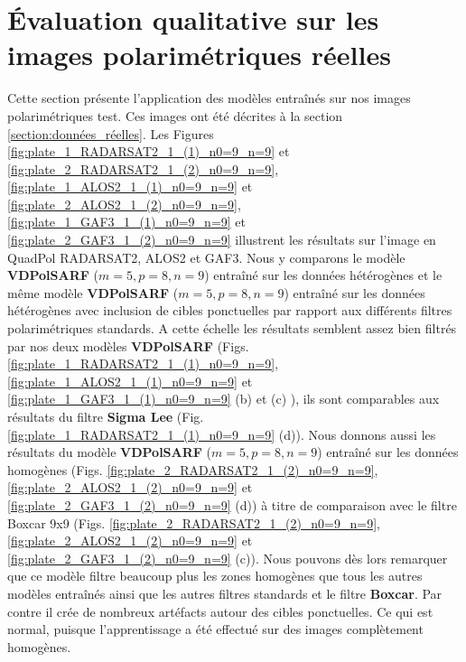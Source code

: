 

\section{Évaluation qualitative sur les images polarimétriques réelles} \label{sec:Evaluation_qualitative_sur_les_images_polarimetriques_reelles}

Cette section présente l'application des modèles entraînés sur nos images polarimétriques test.  Ces images ont été décrites à la section \ref{section:données_réelles}.  Les Figures \ref{fig:plate_1_RADARSAT2_1_(1)_n0=9_n=9} et \ref{fig:plate_2_RADARSAT2_1_(2)_n0=9_n=9}, \ref{fig:plate_1_ALOS2_1_(1)_n0=9_n=9} et \ref{fig:plate_2_ALOS2_1_(2)_n0=9_n=9}, \ref{fig:plate_1_GAF3_1_(1)_n0=9_n=9} et \ref{fig:plate_2_GAF3_1_(2)_n0=9_n=9} illustrent les résultats sur l'image en QuadPol RADARSAT2, ALOS2 et GAF3. Nous y comparons le modèle \textbf{VDPolSARF} ($m=5, p=8, n=9$) entraîné sur les données hétérogènes et le même modèle \textbf{VDPolSARF} ($m=5, p=8, n=9$) entraîné sur les données hétérogènes avec inclusion de cibles ponctuelles par rapport aux différents filtres polarimétriques standards. A cette échelle les résultats semblent assez bien filtrés par nos deux modèles \textbf{VDPolSARF} (Figs. \ref{fig:plate_1_RADARSAT2_1_(1)_n0=9_n=9}, \ref{fig:plate_1_ALOS2_1_(1)_n0=9_n=9} et \ref{fig:plate_1_GAF3_1_(1)_n0=9_n=9} (b) et (c) ), ils sont comparables aux résultats du filtre \textbf{Sigma Lee} (Fig. \ref{fig:plate_1_RADARSAT2_1_(1)_n0=9_n=9} (d)). Nous donnons aussi les résultats du  modèle \textbf{VDPolSARF} ($m=5, p=8, n=9$) entraîné sur les données homogènes   (Figs. \ref{fig:plate_2_RADARSAT2_1_(2)_n0=9_n=9}, \ref{fig:plate_2_ALOS2_1_(2)_n0=9_n=9} et \ref{fig:plate_2_GAF3_1_(2)_n0=9_n=9} (d)) à titre de comparaison avec le filtre Boxcar 9x9 (Figs. \ref{fig:plate_2_RADARSAT2_1_(2)_n0=9_n=9}, \ref{fig:plate_2_ALOS2_1_(2)_n0=9_n=9} et \ref{fig:plate_2_GAF3_1_(2)_n0=9_n=9} (c)). Nous pouvons dès lors remarquer que ce modèle filtre beaucoup plus les zones homogènes que tous les autres modèles entraînés ainsi que les autres filtres standards et le filtre \textbf{Boxcar}.  Par contre il crée de nombreux artéfacts autour des cibles ponctuelles. Ce qui est normal, puisque l'apprentissage a été effectué sur des images complètement homogènes.

